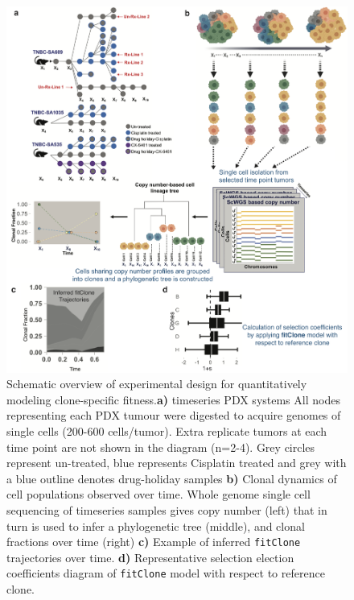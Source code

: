 \begin{figure}
\centering
\includegraphics[width=\textwidth]{Figures/chap4/fig1thesischap4.png}
\caption[Schematic overview of experimental design for quantitatively modeling clone-specific fitness]{Schematic overview of experimental design for quantitatively modeling clone-specific fitness.\textbf{a)} timeseries PDX systems All nodes representing each PDX tumour were digested to acquire genomes of single cells (200-600 cells/tumor). Extra replicate tumors at each time point are not shown in the diagram (n=2-4). Grey circles represent un-treated, blue represents Cisplatin treated and grey with a blue outline denotes drug-holiday samples \textbf{b)} Clonal dynamics of cell populations observed over time. Whole genome single cell sequencing of timeseries samples gives copy number (left) that in turn is used to infer a phylogenetic tree (middle), and clonal fractions over time (right) \textbf{c)} Example of inferred \texttt{fitClone} trajectories over time. \textbf{d)} Representative selection election coefficients diagram of \texttt{fitClone} model with respect to reference clone.}
\label{fig:schematic}
\end{figure}



